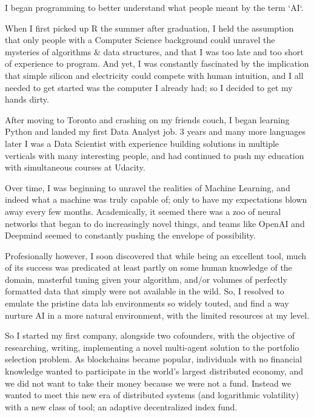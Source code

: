 \documentclass[11pt, a4paper]{awesome-cv}
\begin{document}
\begin{cvletter}
\pagebreak
{}

I began programming to better understand what people meant by the
term `AI`.

When I first picked up R the summer after graduation, I held the assumption that
only people with a Computer Science background could unravel the mysteries of
algorithms \& data structures, and that I was too late and too short of
experience to program. And yet, I was constantly fascinated by the implication that simple silicon
and electricity could compete with human intuition, and I all needed to get
started was the computer I already had; so I decided to get my hands dirty.

After moving to Toronto and crashing on my friends couch, I began learning
Python and landed my first Data Analyst job. 3 years and many more languages later I was a Data
Scientist with experience building solutions in multiple verticals with many
interesting people, and had continued to push my education with
simultaneous courses at Udacity.

Over time, I was beginning to unravel the realities of Machine
Learning, and indeed what a machine was truly capable of; only to have my
expectations blown away every few months. Academically, it seemed there was a
zoo of neural networks that began to do increasingly novel things, and teams
like OpenAI and Deepmind seemed to constantly pushing the envelope of
possibility.

Profesionally however, I soon discovered that while being an excellent tool, much of its success was
predicated at least partly on some human knowledge of the domain, masterful
tuning given your algorithm, and/or volumes of perfectly formatted data that
simply were not available in the wild. So, I resolved to emulate the pristine
data lab environments so widely touted, and find a way nurture AI in a more
natural environment, with the limited resources at my level.

So I started my first company, alongside two cofounders, with the objective of researching,
writing, implementing a novel multi-agent solution to the portfolio
selection problem. As blockchains became popular, individuals with no financial
knowledge wanted to participate in the world's largest distributed economy, and we
did not want to take their money because we were not a fund. Instead we wanted to meet this
new era of distributed systems (and logarithmic volatility) with a new class of tool; an adaptive decentralized
index fund.


\end{cvletter}
\end{document}
